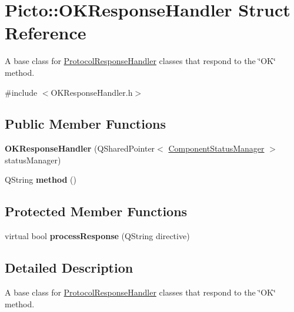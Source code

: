 \hypertarget{struct_picto_1_1_o_k_response_handler}{\section{Picto\-:\-:O\-K\-Response\-Handler Struct Reference}
\label{struct_picto_1_1_o_k_response_handler}
}


A base class for \hyperlink{struct_picto_1_1_protocol_response_handler}{Protocol\-Response\-Handler} classes that respond to the \char`\"{}\-O\-K\char`\"{} method.  




{\ttfamily \#include $<$O\-K\-Response\-Handler.\-h$>$}

\subsection*{Public Member Functions}
\begin{DoxyCompactItemize}
\item 
\hypertarget{struct_picto_1_1_o_k_response_handler_abe1ff1642811d44c430848628ada4add}{{\bfseries O\-K\-Response\-Handler} (Q\-Shared\-Pointer$<$ \hyperlink{class_component_status_manager}{Component\-Status\-Manager} $>$ status\-Manager)}\label{struct_picto_1_1_o_k_response_handler_abe1ff1642811d44c430848628ada4add}

\item 
\hypertarget{struct_picto_1_1_o_k_response_handler_a1b2665738a8cde9880b8b9d3cf2d9e40}{Q\-String {\bfseries method} ()}\label{struct_picto_1_1_o_k_response_handler_a1b2665738a8cde9880b8b9d3cf2d9e40}

\end{DoxyCompactItemize}
\subsection*{Protected Member Functions}
\begin{DoxyCompactItemize}
\item 
\hypertarget{struct_picto_1_1_o_k_response_handler_a7200691c6a52fb3562ca2fe75c4721ef}{virtual bool {\bfseries process\-Response} (Q\-String directive)}\label{struct_picto_1_1_o_k_response_handler_a7200691c6a52fb3562ca2fe75c4721ef}

\end{DoxyCompactItemize}


\subsection{Detailed Description}
A base class for \hyperlink{struct_picto_1_1_protocol_response_handler}{Protocol\-Response\-Handler} classes that respond to the \char`\"{}\-O\-K\char`\"{} method. 

